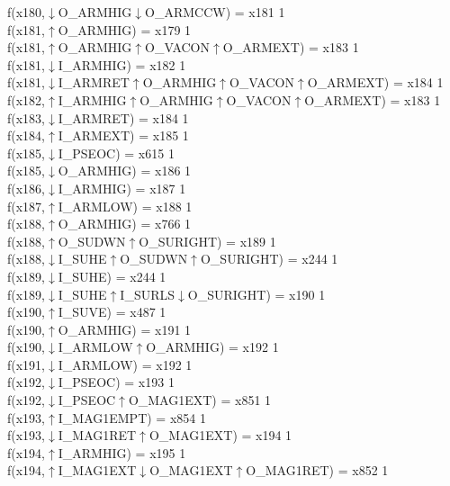 f(x180,$\downarrow$O\_ARMHIG$\downarrow$O\_ARMCCW) = x181 {1} \\
f(x181,$\uparrow$O\_ARMHIG) = x179 {1} \\
f(x181,$\uparrow$O\_ARMHIG$\uparrow$O\_VACON$\uparrow$O\_ARMEXT) = x183 {1} \\
f(x181,$\downarrow$I\_ARMHIG) = x182 {1} \\
f(x181,$\downarrow$I\_ARMRET$\uparrow$O\_ARMHIG$\uparrow$O\_VACON$\uparrow$O\_ARMEXT) = x184 {1} \\
f(x182,$\uparrow$I\_ARMHIG$\uparrow$O\_ARMHIG$\uparrow$O\_VACON$\uparrow$O\_ARMEXT) = x183 {1} \\
f(x183,$\downarrow$I\_ARMRET) = x184 {1} \\
f(x184,$\uparrow$I\_ARMEXT) = x185 {1} \\
f(x185,$\downarrow$I\_PSEOC) = x615 {1} \\
f(x185,$\downarrow$O\_ARMHIG) = x186 {1} \\
f(x186,$\downarrow$I\_ARMHIG) = x187 {1} \\
f(x187,$\uparrow$I\_ARMLOW) = x188 {1} \\
f(x188,$\uparrow$O\_ARMHIG) = x766 {1} \\
f(x188,$\uparrow$O\_SUDWN$\uparrow$O\_SURIGHT) = x189 {1} \\
f(x188,$\downarrow$I\_SUHE$\uparrow$O\_SUDWN$\uparrow$O\_SURIGHT) = x244 {1} \\
f(x189,$\downarrow$I\_SUHE) = x244 {1} \\
f(x189,$\downarrow$I\_SUHE$\uparrow$I\_SURLS$\downarrow$O\_SURIGHT) = x190 {1} \\
f(x190,$\uparrow$I\_SUVE) = x487 {1} \\
f(x190,$\uparrow$O\_ARMHIG) = x191 {1} \\
f(x190,$\downarrow$I\_ARMLOW$\uparrow$O\_ARMHIG) = x192 {1} \\
f(x191,$\downarrow$I\_ARMLOW) = x192 {1} \\
f(x192,$\downarrow$I\_PSEOC) = x193 {1} \\
f(x192,$\downarrow$I\_PSEOC$\uparrow$O\_MAG1EXT) = x851 {1} \\
f(x193,$\uparrow$I\_MAG1EMPT) = x854 {1} \\
f(x193,$\downarrow$I\_MAG1RET$\uparrow$O\_MAG1EXT) = x194 {1} \\
f(x194,$\uparrow$I\_ARMHIG) = x195 {1} \\
f(x194,$\uparrow$I\_MAG1EXT$\downarrow$O\_MAG1EXT$\uparrow$O\_MAG1RET) = x852 {1} \\
